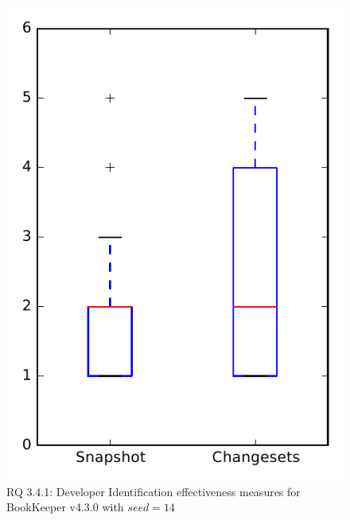 
\begin{figure}
\centering
\includegraphics[height=0.4\textheight]{figures/dit_seed/rq1_bookkeeper_14}
\caption{RQ 3.4.1: Developer Identification effectiveness measures for BookKeeper v4.3.0 with $seed=14$}
\label{fig:dit_seed:rq1:bookkeeper}
\end{figure}
